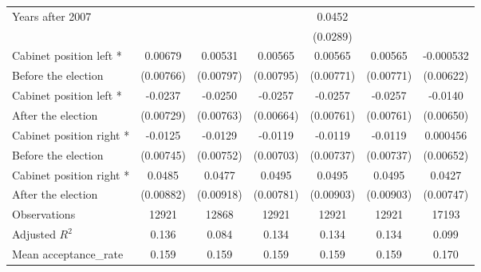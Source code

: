 \begin{table}[!ht]
\begin{tabular}{l*{6}{c}}
Years after 2007    &                     &                     &                     &      0.0452         &                     &                     \\
                    &                     &                     &                     &    (0.0289)         &                     &                     \\
[0,5em]
Cabinet position left * &     0.00679         &     0.00531         &     0.00565         &     0.00565         &     0.00565         &   -0.000532         \\
Before the election                    &   (0.00766)         &   (0.00797)         &   (0.00795)         &   (0.00771)         &   (0.00771)         &   (0.00622)         \\
[0,5em]
Cabinet position left * &     -0.0237\sym{**} &     -0.0250\sym{**} &     -0.0257\sym{***}&     -0.0257\sym{**} &     -0.0257\sym{**} &     -0.0140\sym{*}  \\
After the election                    &   (0.00729)         &   (0.00763)         &   (0.00664)         &   (0.00761)         &   (0.00761)         &   (0.00650)         \\
[0,5em]
Cabinet position right * &     -0.0125         &     -0.0129         &     -0.0119         &     -0.0119         &     -0.0119         &    0.000456         \\
Before the election                    &   (0.00745)         &   (0.00752)         &   (0.00703)         &   (0.00737)         &   (0.00737)         &   (0.00652)         \\
[0,5em]
Cabinet position right * &      0.0485\sym{***}&      0.0477\sym{***}&      0.0495\sym{***}&      0.0495\sym{***}&      0.0495\sym{***}&      0.0427\sym{***}\\
After the election                    &   (0.00882)         &   (0.00918)         &   (0.00781)         &   (0.00903)         &   (0.00903)         &   (0.00747)         \\
\hline
Observations        &       12921         &       12868         &       12921         &       12921         &       12921         &       17193         \\
Adjusted \(R^{2}\)  &       0.136         &       0.084         &       0.134         &       0.134         &       0.134         &       0.099         \\
Mean acceptance\_rate&       0.159         &       0.159         &       0.159         &       0.159         &       0.159         &       0.170         \\

\end{tabular}
\end{table}
